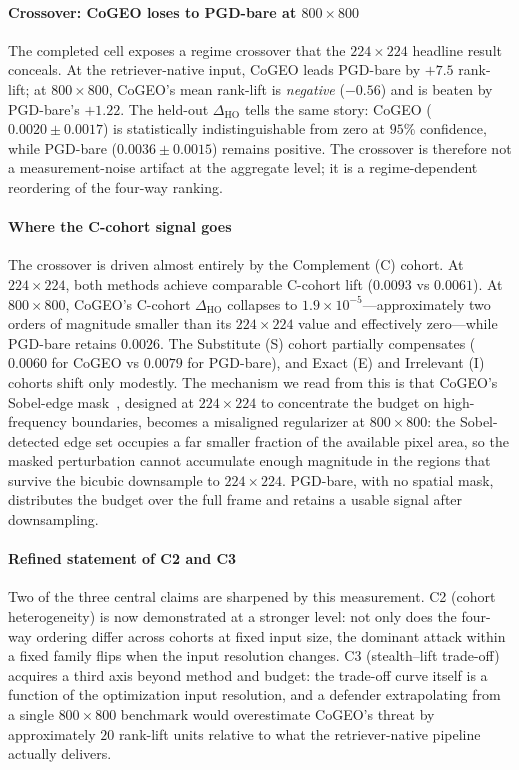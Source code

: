 \paragraph{Crossover: CoGEO loses to PGD-bare at $800 \times 800$} The completed cell exposes a regime crossover that the $224 \times 224$ headline result conceals. At the retriever-native input, CoGEO leads PGD-bare by $+7.5$ rank-lift; at $800 \times 800$, CoGEO's mean rank-lift is \emph{negative} ($-0.56$) and is beaten by PGD-bare's $+1.22$. The held-out $\Delta_{\mathrm{HO}}$ tells the same story: CoGEO ($0.0020 \pm 0.0017$) is statistically indistinguishable from zero at $95\%$ confidence, while PGD-bare ($0.0036 \pm 0.0015$) remains positive. The crossover is therefore not a measurement-noise artifact at the aggregate level; it is a regime-dependent reordering of the four-way ranking.

\paragraph{Where the C-cohort signal goes} The crossover is driven almost entirely by the Complement (C) cohort. At $224 \times 224$, both methods achieve comparable C-cohort lift ($0.0093$ vs $0.0061$). At $800 \times 800$, CoGEO's C-cohort $\Delta_{\mathrm{HO}}$ collapses to $1.9 \times 10^{-5}$---approximately two orders of magnitude smaller than its $224 \times 224$ value and effectively zero---while PGD-bare retains $0.0026$. The Substitute (S) cohort partially compensates ($0.0060$ for CoGEO vs $0.0079$ for PGD-bare), and Exact (E) and Irrelevant (I) cohorts shift only modestly. The mechanism we read from this is that CoGEO's Sobel-edge mask~\cite{kanopoulos1988sobel}, designed at $224 \times 224$ to concentrate the budget on high-frequency boundaries, becomes a misaligned regularizer at $800 \times 800$: the Sobel-detected edge set occupies a far smaller fraction of the available pixel area, so the masked perturbation cannot accumulate enough magnitude in the regions that survive the bicubic downsample to $224 \times 224$. PGD-bare, with no spatial mask, distributes the budget over the full frame and retains a usable signal after downsampling.

\paragraph{Refined statement of C2 and C3} Two of the three central claims are sharpened by this measurement. C2 (cohort heterogeneity) is now demonstrated at a stronger level: not only does the four-way ordering differ across cohorts at fixed input size, the dominant attack within a fixed family flips when the input resolution changes. C3 (stealth--lift trade-off) acquires a third axis beyond method and budget: the trade-off curve itself is a function of the optimization input resolution, and a defender extrapolating from a single $800 \times 800$ benchmark would overestimate CoGEO's threat by approximately $20$ rank-lift units relative to what the retriever-native pipeline actually delivers.

